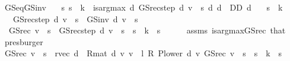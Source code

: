 \begin{isabellebody}
\endisatagproof
{\isafoldproof}%
%
\isadelimproof
\isanewline
%
\endisadelimproof
\isanewline
{}\isamarkupfalse%
\ GS{\isacharunderscore}{\kern0pt}eq{\isacharunderscore}{\kern0pt}GS{\isacharunderscore}{\kern0pt}inv{\isacharcolon}{\kern0pt}\isanewline
\ \ \ {\isachardoublequoteopen}{\isasymAnd}s{\isachardot}{\kern0pt}\ s\ {\isasymle}\ k\ {\isasymLongrightarrow}\ is{\isacharunderscore}{\kern0pt}arg{\isacharunderscore}{\kern0pt}max\ {\isacharparenleft}{\kern0pt}{\isasymlambda}d{\isachardot}{\kern0pt}\ GS{\isacharunderscore}{\kern0pt}rec{\isacharunderscore}{\kern0pt}step\ d\ v\ {\isachardollar}{\kern0pt}\ s{\isacharparenright}{\kern0pt}\ {\isacharparenleft}{\kern0pt}{\isasymlambda}d{\isachardot}{\kern0pt}\ d\ {\isasymin}\ D\isactrlsub D{\isacharparenright}{\kern0pt}\ d{\isachardoublequoteclose}\isanewline
\ \ \ {\isachardoublequoteopen}s\ {\isasymle}\ k{\isachardoublequoteclose}\isanewline
\ \ \ {\isachardoublequoteopen}GS{\isacharunderscore}{\kern0pt}rec{\isacharunderscore}{\kern0pt}step\ d\ v\ {\isachardollar}{\kern0pt}\ s\ {\isacharequal}{\kern0pt}\ GS{\isacharunderscore}{\kern0pt}inv\ d\ v\ {\isachardollar}{\kern0pt}\ s{\isachardoublequoteclose}\isanewline
%
\isadelimproof
%
\endisadelimproof
%
\isatagproof
{}\isamarkupfalse%
\ {\isacharminus}{\kern0pt}\isanewline
\ \ \isamarkupfalse%
\ {\isacharasterisk}{\kern0pt}{\isacharcolon}{\kern0pt}\ {\isachardoublequoteopen}GS{\isacharunderscore}{\kern0pt}rec\ v\ {\isachardollar}{\kern0pt}\ s\ {\isacharequal}{\kern0pt}\ GS{\isacharunderscore}{\kern0pt}rec{\isacharunderscore}{\kern0pt}step\ d\ v\ {\isachardollar}{\kern0pt}\ s{\isachardoublequoteclose}\ \ {\isachardoublequoteopen}s\ {\isasymle}\ k{\isachardoublequoteclose}\ \ s\isanewline
\ \ \ \ \isamarkupfalse%
\ assms\ is{\isacharunderscore}{\kern0pt}arg{\isacharunderscore}{\kern0pt}max{\isacharunderscore}{\kern0pt}GS{\isacharunderscore}{\kern0pt}rec{\isacharprime}{\kern0pt}\ that\ \isamarkupfalse%
\ presburger\isanewline
\ \ \isamarkupfalse%
\ {\isachardoublequoteopen}GS{\isacharunderscore}{\kern0pt}rec\ v\ {\isachardollar}{\kern0pt}\ s\ {\isacharequal}{\kern0pt}\ {\isacharparenleft}{\kern0pt}r{\isacharunderscore}{\kern0pt}vec\ d\ {\isacharplus}{\kern0pt}\ R{\isacharunderscore}{\kern0pt}mat\ d\ {\isacharasterisk}{\kern0pt}v\ v\ {\isacharplus}{\kern0pt}\ {\isacharparenleft}{\kern0pt}l\ {\isacharasterisk}{\kern0pt}\isactrlsub R\ P{\isacharunderscore}{\kern0pt}lower\ d{\isacharparenright}{\kern0pt}\ {\isacharasterisk}{\kern0pt}v\ GS{\isacharunderscore}{\kern0pt}rec\ v{\isacharparenright}{\kern0pt}\ {\isachardollar}{\kern0pt}\ s{\isachardoublequoteclose}\ \ {\isachardoublequoteopen}s\ {\isasymle}\ k{\isachardoublequoteclose}\ \ s\isanewline

\end{isabellebody}
